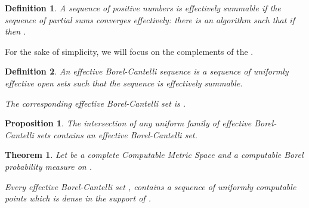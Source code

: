 \documentclass[copyright,creativecommons]{eptcs}
\newtheorem{theorem}{Theorem}
\newtheorem{definition}{Definition}
\newtheorem{proposition}{Proposition}
\numberwithin{equation}{section}
\begin{document}
\begin{definition}
A sequence of positive numbers  is \emph{effectively summable} if the
sequence of partial sums converges effectively: there is an algorithm  such that if  then .
\end{definition}

For the sake of simplicity, we will focus on the complements  of the .

\begin{definition}
\label{ebc}An \emph{effective Borel-Cantelli sequence} is a sequence  of uniformly effective open sets such that the
sequence  is effectively summable.

The corresponding \emph{effective Borel-Cantelli set} is .
\end{definition}

\begin{proposition}
\label{intersection_BC_proposition} The intersection of any uniform family
of effective Borel-Cantelli sets contains an effective Borel-Cantelli set.
\end{proposition}

\begin{theorem}
\label{effective_BC_theorem} Let  be a complete Computable Metric Space
and  a computable Borel probability measure on .

Every effective Borel-Cantelli set , contains a sequence of uniformly
computable points which is dense in the support of .
\end{theorem}
\end{document}
